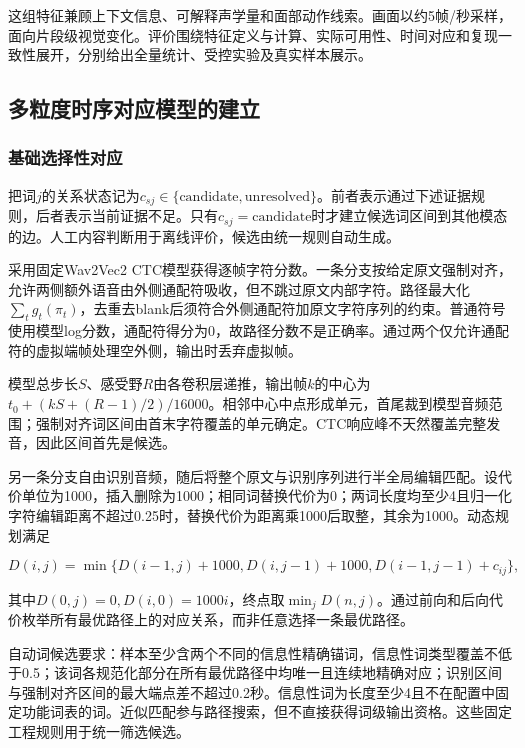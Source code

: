 这组特征兼顾上下文信息、可解释声学量和面部动作线索。画面以约5帧/秒采样，面向片段级视觉变化。评价围绕特征定义与计算、实际可用性、时间对应和复现一致性展开，分别给出全量统计、受控实验及真实样本展示。

\hypertarget{q1-ux591aux7c92ux5ea6ux65f6ux5e8fux5bf9ux5e94ux6a21ux578bux7684ux5efaux7acb}{%
\subsection{多粒度时序对应模型的建立}\label{q1-ux591aux7c92ux5ea6ux65f6ux5e8fux5bf9ux5e94ux6a21ux578bux7684ux5efaux7acb}}

\hypertarget{q1-ux57faux7840ux9009ux62e9ux6027ux5bf9ux5e94}{%
\subsubsection{基础选择性对应}\label{q1-ux57faux7840ux9009ux62e9ux6027ux5bf9ux5e94}}

把词\(j\)的关系状态记为\(c_{sj}\in\{\mathrm{candidate},\mathrm{unresolved}\}\)。前者表示通过下述证据规则，后者表示当前证据不足。只有\(c_{sj}=\mathrm{candidate}\)时才建立候选词区间到其他模态的边。人工内容判断用于离线评价，候选由统一规则自动生成。

采用固定Wav2Vec2 CTC\cite{q1-ref4}模型获得逐帧字符分数。一条分支按给定原文强制对齐，允许两侧额外语音由外侧通配符吸收，但不跳过原文内部字符。路径最大化\(\sum_tg_t(\pi_t)\)，去重去blank后须符合外侧通配符加原文字符序列的约束。普通符号使用模型log分数，通配符得分为0，故路径分数不是正确率。通过两个仅允许通配符的虚拟端帧处理空外侧，输出时丢弃虚拟帧。

模型总步长\(S\)、感受野\(R\)由各卷积层递推，输出帧\(k\)的中心为\(t_0+(kS+(R-1)/2)/16000\)。相邻中心中点形成单元，首尾裁到模型音频范围；强制对齐词区间由首末字符覆盖的单元确定。CTC响应峰不天然覆盖完整发音，因此区间首先是候选。

另一条分支自由识别音频，随后将整个原文与识别序列进行半全局编辑匹配。设代价单位为1000，插入删除为1000；相同词替换代价为0；两词长度均至少4且归一化字符编辑距离不超过0.25时，替换代价为距离乘1000后取整，其余为1000。动态规划满足

\begin{equation}D(i,j)=\min\{D(i-1,j)+1000,D(i,j-1)+1000,D(i-1,j-1)+c_{ij}\},\end{equation}

其中\(D(0,j)=0,D(i,0)=1000i\)，终点取\(\min_jD(n,j)\)。通过前向和后向代价枚举所有最优路径上的对应关系，而非任意选择一条最优路径。

自动词候选要求：样本至少含两个不同的信息性精确锚词，信息性词类型覆盖不低于0.5；该词各规范化部分在所有最优路径中均唯一且连续地精确对应；识别区间与强制对齐区间的最大端点差不超过0.2秒。信息性词为长度至少4且不在配置中固定功能词表的词。近似匹配参与路径搜索，但不直接获得词级输出资格。这些固定工程规则用于统一筛选候选。

